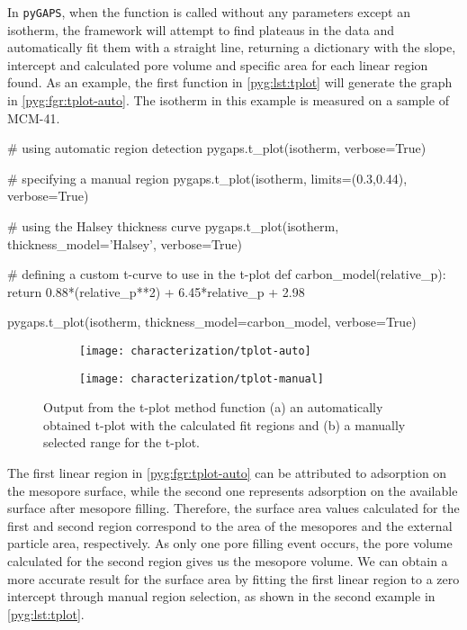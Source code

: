 In \texttt{pyGAPS}, when the function is called without any parameters
except an isotherm, the framework will attempt to find 
plateaus in the data and
automatically fit them with a straight line, returning a dictionary
with the slope, intercept and calculated pore volume and specific area
for each linear region found. As an example, the first function in
\autoref{pyg:lst:tplot} will generate the graph in
\autoref{pyg:fgr:tplot-auto}. The isotherm in this example is measured
on a sample of MCM-41.

\begin{python}[float=htb, caption={Generating a t-plot},%
    label={pyg:lst:tplot}]
# using automatic region detection
pygaps.t_plot(isotherm, verbose=True)

# specifying a manual region
pygaps.t_plot(isotherm, limits=(0.3,0.44), verbose=True)

# using the Halsey thickness curve
pygaps.t_plot(isotherm, thickness_model='Halsey', verbose=True)

# defining a custom t-curve to use in the t-plot
def carbon_model(relative_p):
	return 0.88*(relative_p**2) + 6.45*relative_p + 2.98

pygaps.t_plot(isotherm, thickness_model=carbon_model, verbose=True)
\end{python}

\begin{figure}[!htb]
	\centering

	\begin{subfigure}{0.45\linewidth}
		\parbox[c]{0.1\linewidth}{\caption{}%
			\label{pyg:fgr:tplot-auto}}
		\parbox[b]{0.85\linewidth}{%
			\texttt{[image: characterization/tplot-auto]}}
	\end{subfigure}%
	\begin{subfigure}{0.45\linewidth}
		\parbox[c]{0.1\linewidth}{\caption{}%
			\label{pyg:fgr:tplot-manual}}
		\parbox[b]{0.85\linewidth}{%
			\texttt{[image: characterization/tplot-manual]}}
	\end{subfigure}%

	\caption{Output from the t-plot method function (a) an automatically
		obtained t-plot with the calculated fit regions and (b) a manually
		selected range for the t-plot.}%
	\label{pyg:fgr:tplot}

\end{figure}

The first linear region in \autoref{pyg:fgr:tplot-auto} can be attributed
to adsorption on the mesopore surface,
while the second one represents adsorption on the available surface
after mesopore filling. Therefore, the surface area values calculated 
for the first and second region correspond to the area of the mesopores
and the external particle area, respectively. As only one pore filling 
event occurs, the pore volume calculated for the second region gives
us the mesopore volume. We can obtain a more accurate result for the
surface area by fitting the first linear region to a zero intercept
through manual region selection, as shown in the second example in 
\autoref{pyg:lst:tplot}.

